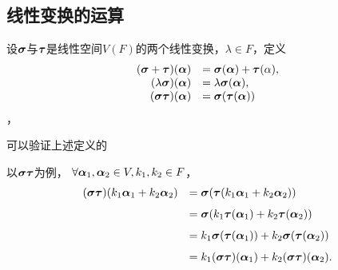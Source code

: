 \subsection{线性变换的运算}
\begin{frame}
\begin{dingyi}
  设$\sigmabd$与$\taubd$是线性空间$V(F)$的两个线性变换，$\lambda\in F$，定义
  $$
  \begin{array}{rl}
    (\sigmabd+\taubd)(\alphabd)&=\sigmabd(\alphabd)+\taubd(\alpha),\\
    (\lambda\sigmabd)(\alphabd)&=\lambda\sigmabd(\alphabd), \\
    (\sigmabd\taubd)(\alphabd)&=\sigmabd(\taubd(\alphabd))
  \end{array}
  $$，
\end{dingyi}
\end{frame}

\begin{frame}
  可以验证上述定义的\vspace{.1in} \pause 


  以$\sigmabd\taubd$为例，
  $\forall \alphabd_1,\alphabd_2\in V, k_1,k_2\in F$，
  $$
  \begin{array}{rl}
    (\sigmabd\taubd)(k_1\alphabd_1+k_2\alphabd_2)&=\sigmabd(\taubd(k_1\alphabd_1+k_2\alphabd_2))\\[.1in]
                                                 &=\sigmabd(k_1\taubd(\alphabd_1)+k_2\taubd(\alphabd_2))\\[.1in]
                                                 &=k_1\sigmabd(\taubd(\alphabd_1))+k_2\sigmabd(\taubd(\alphabd_2))\\[.1in]
                                                 &=k_1(\sigmabd\taubd)(\alphabd_1)+k_2(\sigmabd\taubd)(\alphabd_2).
  \end{array}
  $$
\end{frame}

